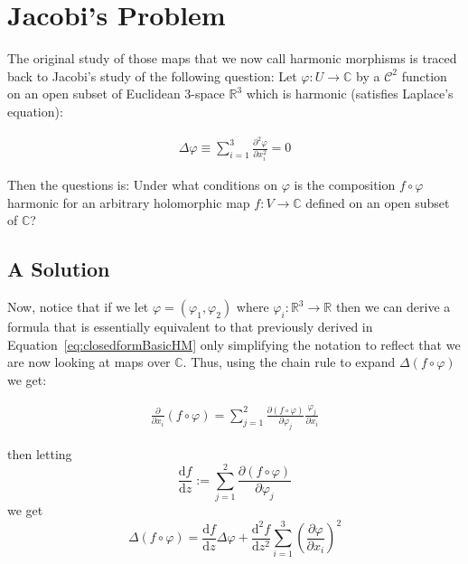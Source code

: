 \documentclass[12pt]{article}
\theoremstyle{definition}
\numberwithin{equation}{subsection}
\begin{document}




\section{Jacobi's Problem}
\indent The original study of those maps that we now call harmonic morphisms is traced back to Jacobi's study of the following question:
Let $\varphi: U \rightarrow \mathbb{C}$ by a $\mathcal{C}^2$ function on an open subset of Euclidean 3-space $\mathbb{R}^3$ which is harmonic (satisfies Laplace's equation): 

\begin{align*}
    \Delta \varphi \equiv \sum_{i=1}^{3} \frac{\partial^2 \varphi}{\partial x_i^2} = 0
\end{align*}

Then the questions is: Under what conditions on $\varphi$ is the composition $f \circ \varphi$ harmonic for an arbitrary holomorphic map $f:V\rightarrow \mathbb{C}$ defined on an open subset of $\mathbb{C}$?\\

\subsection{A Solution}
Now, notice that if we let $\varphi = ( \varphi_1 , \varphi_2)$ where $\varphi_i: \mathbb{R}^3 \rightarrow \mathbb{R}$ then we can derive a formula that is essentially equivalent to that previously derived in Equation~\ref{eq:closedformBasicHM} only simplifying the notation to reflect that we are now looking at maps over $\mathbb{C}$. Thus,  using the chain rule to expand $\Delta(f \circ \varphi)$ we get:

\begin{align*}
    \frac{\partial}{\partial x_i} (f \circ \varphi) = \sum_{j=1}^{2}\frac{\partial (f \circ \varphi)}{ \partial \varphi_j} \frac{\varphi_j}{\partial x_i}
\end{align*}

then letting
$$ \frac{\text{d}f}{\text{d}z} := \sum_{j=1}^2 \frac{\partial (f \circ \varphi)}{\partial \varphi_j} $$
we get 
\begin{equation} \label{eq:1}
    \Delta (f \circ \varphi) = \frac{\text{d}f}{\text{d}z} \Delta \varphi + \frac{\text{d}^2f}{\text{d}z^2} \sum_{i=1}^3 \left(\frac{\partial \varphi}{\partial x_i}\right)^2    
\end{equation}
\end{document}
